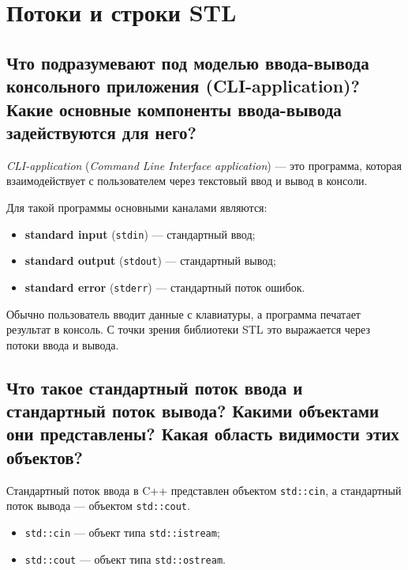 \section{Потоки и строки STL}

\subsection{Что подразумевают под моделью ввода-вывода консольного приложения (CLI-application)? Какие основные компоненты ввода-вывода задействуются для него?}
\begin{definition}
\textit{CLI-application} (\textit{Command Line Interface application}) — это программа, которая взаимодействует с пользователем через текстовый ввод и вывод в консоли.
\end{definition}

Для такой программы основными каналами являются:
\begin{itemize}
    \item \textbf{standard input} (\texttt{stdin}) — стандартный ввод;
    \item \textbf{standard output} (\texttt{stdout}) — стандартный вывод;
    \item \textbf{standard error} (\texttt{stderr}) — стандартный поток ошибок.
\end{itemize}

Обычно пользователь вводит данные с клавиатуры, а программа печатает результат в консоль. С точки зрения библиотеки STL это выражается через потоки ввода и вывода.

\subsection{Что такое стандартный поток ввода и стандартный поток вывода? Какими объектами они представлены? Какая область видимости этих объектов?}
Стандартный поток ввода в C++ представлен объектом \texttt{std::cin}, а стандартный поток вывода — объектом \texttt{std::cout}.

\begin{definition}
\begin{itemize}
    \item \texttt{std::cin} — объект типа \texttt{std::istream};
    \item \texttt{std::cout} — объект типа \texttt{std::ostream}.
\end{itemize}
\end{definition}

